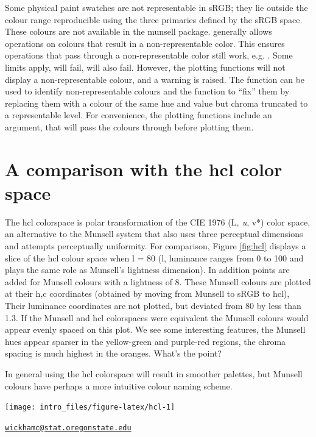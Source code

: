 Some physical paint swatches are not representable in sRGB; they lie
outside the colour range reproducible using the three primaries defined
by the sRGB space. These colours are not available in the munsell
package.  generally allows operations on colours that
result in a non-representable color. This ensures operations that pass
through a non-representable color still work, e.g.
. Some limits apply,
 will fail,
 will also fail. However, the
plotting functions will not display a non-representable colour, and a
warning is raised. The function  can be used to identify
non-representable colours and the function  to ``fix''
them by replacing them with a colour of the same hue and value but
chroma truncated to a representable level. For convenience, the plotting
functions include an argument,  that will pass the colours
through  before plotting them.

\section{A comparison with the hcl color
space}\label{a-comparison-with-the-hcl-color-space}

The hcl colorspace is polar transformation of the CIE 1976 (L\emph{, u},
v*) color space, an alternative to the Munsell system that also uses
three perceptual dimensions and attempts perceptually uniformity. For
comparison, Figure \ref{fig:hcl} displays a slice of the hcl colour
space when l = 80 (l, luminance ranges from 0 to 100 and plays the same
role as Munsell's lightness dimension). In addition points are added for
Munsell colours with a lightness of 8. These Munsell colours are plotted
at their h,c coordinates (obtained by moving from Munsell to sRGB to
hcl), Their luminance coordinates are not plotted, but deviated from 80
by less than 1.3. If the Munsell and hcl colorspaces were equivalent the
Munsell colours would appear evenly spaced on this plot. We see some
interesting features, the Munsell hues appear sparser in the
yellow-green and purple-red regions, the chroma spacing is much highest
in the oranges. What's the point?

In general using the hcl colorspace will result in smoother palettes,
but Munsell colours have perhaps a more intuitive colour naming scheme.

\begin{Schunk}

\texttt{[image: intro\_files/figure-latex/hcl-1]} \end{Schunk}



\address{
Charlotte Wickham\\
Oregon State University\\
Department of Statistics, 44 Kidder Hall\\ Corvallis, OR, USA 97330\\
}
\href{mailto:wickhamc@stat.oregonstate.edu}{\nolinkurl{wickhamc@stat.oregonstate.edu}}

